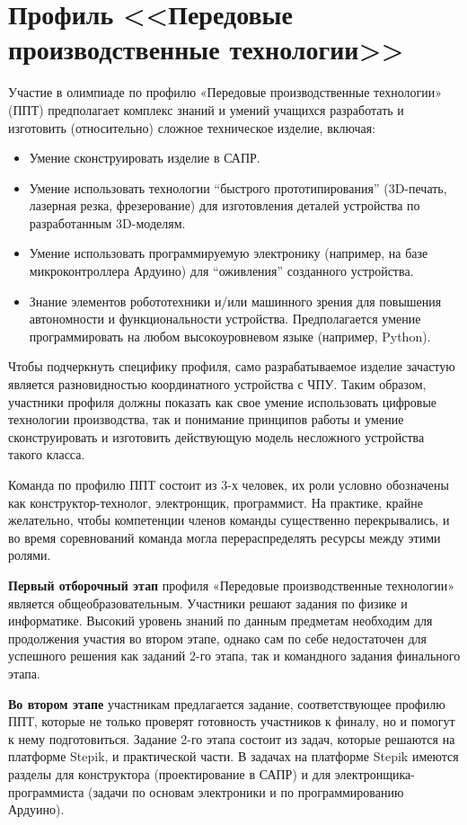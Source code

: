 

\section*{Профиль <<Передовые производственные технологии>>}

Участие в олимпиаде по профилю «Передовые производственные технологии» (ППТ) предполагает комплекс знаний и умений учащихся разработать и изготовить (относительно) сложное техническое изделие, включая:
\begin{itemize}
    \item Умение сконструировать изделие в САПР.
    \item Умение использовать технологии “быстрого прототипирования” (3D-печать, лазерная резка, фрезерование) для изготовления деталей устройства по разработанным 3D-моделям. 
    \item Умение использовать программируемую электронику (например, на базе микроконтроллера Ардуино) для “оживления” созданного устройства.
    \item Знание элементов робототехники и/или машинного зрения для повышения автономности и функциональности устройства.  Предполагается умение программировать на любом высокоуровневом языке (например, Python).
\end{itemize}

Чтобы подчеркнуть специфику профиля, само разрабатываемое изделие зачастую является разновидностью координатного устройства с ЧПУ.  Таким образом, участники профиля должны показать как свое умение использовать цифровые технологии производства, так и понимание принципов работы и умение сконструировать и изготовить действующую модель несложного устройства такого класса.

Команда по профилю ППТ состоит из 3-х человек, их роли условно обозначены как конструктор-технолог, электронщик, программист.  На практике, крайне желательно, чтобы компетенции членов команды существенно перекрывались, и во время соревнований команда могла перераспределять ресурсы между этими ролями.

\textbf{Первый отборочный этап} профиля «Передовые производственные технологии» является общеобразовательным. Участники решают задания по физике и информатике. Высокий уровень знаний по данным предметам необходим для продолжения участия во втором этапе, однако сам по себе недостаточен для успешного решения как заданий 2-го этапа, так и командного задания финального этапа. 

\textbf{Во втором этапе} участникам предлагается задание, соответствующее профилю ППТ, которые не только проверят готовность участников к финалу, но и помогут к нему подготовиться. Задание 2-го этапа состоит из задач, которые решаются на платформе Stepik, и практической части. В задачах на платформе Stepik имеются разделы для конструктора (проектирование в САПР) и для электронщика-программиста (задачи по основам электроники и по программированию Ардуино). 

